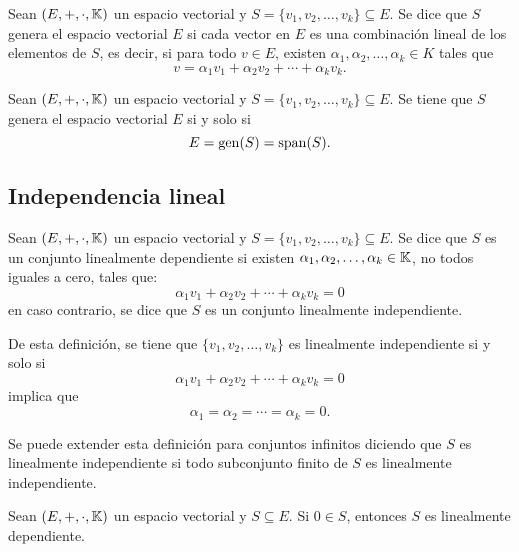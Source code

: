 \documentclass[a4,11pt]{aleph-notas}
\begin{document}
\begin{defi}
    Sean $(E,+,\cdot,\mathbb{K})$ un espacio vectorial y $S=\{v_1,v_2,\ldots,v_k\}\subseteq E$. Se dice que $S$ genera el espacio vectorial $E$ si cada vector en $E$ es una combinación lineal de los elementos de $S$, es decir, si para todo $v\in E$, existen $\alpha_1, \alpha_2, \ldots, \alpha_k\in K$ tales que
    \[
        v = \alpha_1v_1+ \alpha_2v_2+ \cdots+ \alpha_k v_k.
    \]
\end{defi}


\begin{teo}
    Sean $(E,+,\cdot,\mathbb{K})$ un espacio vectorial y $S=\{v_1,v_2,\ldots,v_k\}\subseteq E$. Se tiene que $S$ genera el espacio vectorial $E$ si y solo si
    \[
        E = \operatorname{gen}(S) = \operatorname{span}(S).
    \]
\end{teo}

\subsection{Independencia lineal}

\begin{defi}
    Sean $(E,+,\cdot,\mathbb{K})$ un espacio vectorial y $S=\{v_1,v_2,\ldots,v_k\}\subseteq E$. Se dice que $S$ es un conjunto linealmente dependiente si existen $\alpha_1, \alpha_2, \ldots, \alpha_k \in \mathbb{K}$, no todos iguales a cero, tales que:
    \[
        \alpha_1 v_1 + \alpha_2 v_2 + \cdots + \alpha_k v_k = 0
    \]
    en caso contrario, se dice que $S$ es un conjunto linealmente independiente. 
\end{defi}

\begin{advertencia}
    De esta definición, se tiene que $\{v_1,v_2,\ldots,v_k\}$ es linealmente independiente si y solo si
    \[
        \alpha_1 v_1 + \alpha_2 v_2 + \cdots + \alpha_k v_k = 0
    \]
    implica que
    \[
        \alpha_1 = \alpha_2 = \cdots = \alpha_k = 0.
    \]
\end{advertencia}

\begin{advertencia}
    Se puede extender esta definición para conjuntos infinitos diciendo que $S$ es linealmente independiente si todo subconjunto finito de $S$ es linealmente independiente.
\end{advertencia}

\begin{teo}
    Sean $(E,+,\cdot,\mathbb{K})$ un espacio vectorial y $S\subseteq E$. Si $0\in S$, entonces $S$ es linealmente dependiente.
\end{teo}
\end{document}
